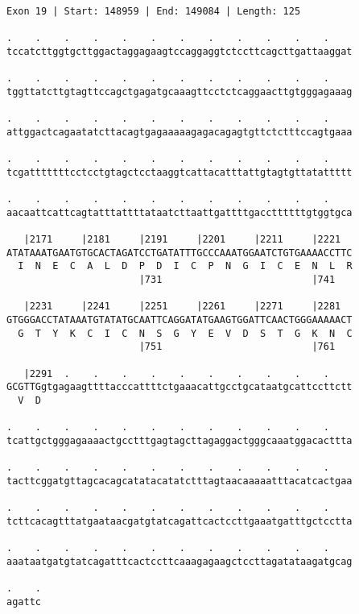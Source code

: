 \documentclass{article}
\begin{document}
\begin{Verbatim}
Exon 19 | Start: 148959 | End: 149084 | Length: 125
 
.    .    .    .    .    .    .    .    .    .    .    .    
tccatcttggtgcttggactaggagaagtccaggaggtctccttcagcttgattaaggat
  
.    .    .    .    .    .    .    .    .    .    .    .    
tggttatcttgtagttccagctgagatgcaaagttcctctcaggaacttgtgggagaaag
  
.    .    .    .    .    .    .    .    .    .    .    .    
attggactcagaatatcttacagtgagaaaaagagacagagtgttctctttccagtgaaa
  
.    .    .    .    .    .    .    .    .    .    .    .    
tcgatttttttcctcctgtagctcctaaggtcattacatttattgtagtgttatattttt
  
.    .    .    .    .    .    .    .    .    .    .    .    
aacaattcattcagtatttattttataatcttaattgattttgaccttttttgtggtgca
  
   |2171     |2181     |2191     |2201     |2211     |2221  
ATATAAATGAATGTGCACTAGATCCTGATATTTGCCCAAATGGAATCTGTGAAAACCTTC
  I  N  E  C  A  L  D  P  D  I  C  P  N  G  I  C  E  N  L  R
                       |731                          |741   
  
   |2231     |2241     |2251     |2261     |2271     |2281  
GTGGGACCTATAAATGTATATGCAATTCAGGATATGAAGTGGATTCAACTGGGAAAAACT
  G  T  Y  K  C  I  C  N  S  G  Y  E  V  D  S  T  G  K  N  C
                       |751                          |761   
  
   |2291  .    .    .    .    .    .    .    .    .    .    
GCGTTGgtgagaagttttacccattttctgaaacattgcctgcataatgcattccttctt
  V  D                                                      
  
.    .    .    .    .    .    .    .    .    .    .    .    
tcattgctgggagaaaactgcctttgagtagcttagaggactgggcaaatggacacttta
  
.    .    .    .    .    .    .    .    .    .    .    .    
tacttcggatgttagcacagcatatacatatctttagtaacaaaaatttacatcactgaa
  
.    .    .    .    .    .    .    .    .    .    .    .    
tcttcacagtttatgaataacgatgtatcagattcactccttgaaatgatttgctcctta
  
.    .    .    .    .    .    .    .    .    .    .    .    
aaataatgatgtatcagatttcactccttcaaagagaagctccttagatataagatgcag
  
.    .
agattc
\end{Verbatim}
\newpage
\end{document}
